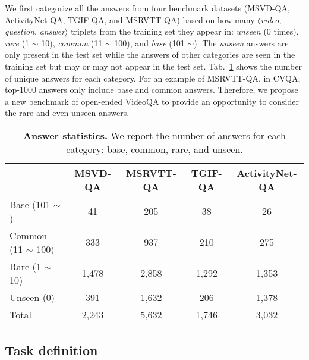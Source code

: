 \documentclass[10pt,twocolumn,letterpaper]{article}
\begin{document}
We first categorize all the answers from four benchmark datasets (MSVD-QA, ActivityNet-QA, TGIF-QA, and MSRVTT-QA) based on how many $\langle$\textit{video}, \textit{question}, \textit{answer}$\rangle$ triplets from the training set they appear in: \textit{unseen} (0 times), \textit{rare} (1 $\sim$ 10), \textit{common} (11 $\sim$ 100), and \textit{base} (101 $\sim$).
The \textit{unseen} answers are only present in the test set while the answers of other categories are seen in the training set but may or may not appear in the test set.
Tab.~\ref{tab:statistics} shows the number of unique answers for each category.
For an example of MSRVTT-QA, in CVQA, top-1000 answers only include base and common answers.
Therefore, we propose a new benchmark of open-ended VideoQA to provide an opportunity to consider the rare and even unseen answers. \begin{table}[t!]
    \centering
    \begin{adjustbox}{width=\linewidth}
    \begin{tabular}{l|c c c c}
        \toprule
        & MSVD-QA & MSRVTT-QA & TGIF-QA & ActivityNet-QA \\
        \midrule
        \midrule 
        Base (101 $\sim$)   & 41 & 205 & 38 & 26 \\
        Common (11 $\sim$ 100) & 333 & 937 & 210 & 275 \\
        Rare (1 $\sim$ 10)   & 1,478 & 2,858 & 1,292 & 1,353 \\
        Unseen (0) & 391 & 1,632 & 206 & 1,378 \\
        \midrule
        Total   & 2,243 & 5,632 & 1,746 & 3,032 \\
        \bottomrule
    \end{tabular}
    \end{adjustbox}
    \caption{\textbf{Answer statistics.}
    We report the number of answers for each category: base, common, rare, and unseen.
    }
    \label{tab:statistics}
\end{table} \subsection{Task definition}
\end{document}
